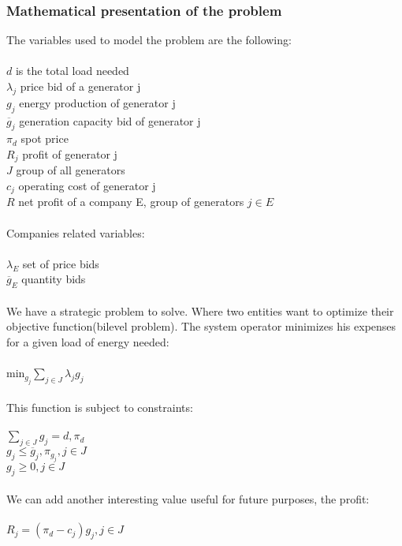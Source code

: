 \documentclass[letterpaper]{article}
\begin{document}
\subsubsection{Mathematical presentation of the problem}
The variables used to model the problem are the following: \\ \\
$d$ is the total load needed \\ 
$\lambda_j$ price bid of a generator j \\ 
$g_j$ energy production of generator j \\ 
$\overline{g}_j$ generation capacity bid of generator j \\ 
$\pi_d$ spot price \\ 
$R_j$ profit of generator j \\ 
$J$ group of all generators \\ 
$c_j$ operating cost of generator j \\ 
$R$ net profit of a company E, group of generators $j \in E$ \\ \\
Companies related variables: \\ \\
$\lambda_E$ set of price bids \\
$\overline{g}_E$ quantity bids \\ \\
We have a strategic problem to solve. Where two entities want to optimize their objective function(bilevel problem). The system operator minimizes his expenses for a given load of energy needed:\\ \\
min$_{g_j} \sum_{j \in J} \lambda_j g_j$ \\ \\
This function is subject to constraints:\\ \\
$\sum_{j \in J} g_j = d, \pi_d$ \\
$g_j \leq \overline{g}_j, \pi_{g_j}, j \in J$ \\
$g_j \geq 0, j\in J$ \\ \\
We can add another interesting value useful for future purposes, the profit:\\ \\
$R_j = (\pi_d - c_j)g_j, j \in J$ \\ \\
\end{document}
